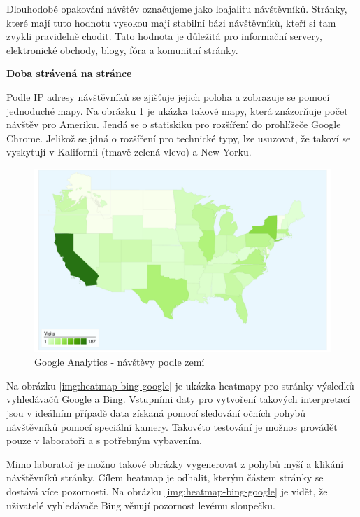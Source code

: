 \documentclass[bc,female,java,dept456]{diploma}						%
\begin{document}
Dlouhodobé opakování návštěv označujeme jako loajalitu návštěvníků. Stránky, které mají tuto hodnotu vysokou mají stabilní bázi návštěvníků, kteří si tam zvykli pravidelně chodit. Tato hodnota je důležitá pro informační servery, elektronické obchody, blogy, fóra a komunitní stránky.

{\bf Doba strávená na stránce}

\bigskip

Podle IP adresy návštěvníků se zjišťuje jejich poloha a zobrazuje se pomocí jednoduché mapy. Na obrázku \ref{img:analytics-map} je ukázka takové mapy, která znázorňuje počet návštěv pro Ameriku. Jendá se o statiskiku pro rozšíření do prohlížeče Google Chrome. Jelikož se jdná o rozšíření pro technické typy, lze usuzovat, že takoví se vyskytují v Kalifornii (tmavě zelená vlevo) a New Yorku.

\begin{figure}[hp]
	\centering
	\includegraphics[width=14.25cm]{img/map-analytics.pdf}
	\caption{Google Analytics - návštěvy podle zemí}
	\label{img:analytics-map}
\end{figure}

\bigskip

Na obrázku \ref{img:heatmap-bing-google} je ukázka heatmapy pro stránky výsledků vyhledávačů Google a Bing. Vstupními daty pro vytvoření takových interpretací jsou v ideálním případě data získaná pomocí sledování očních pohybů návštěvníků pomocí speciální kamery. Takovéto testování je možnos provádět pouze v laboratoři a s potřebným vybavením.

Mimo laboratoř je možno takové obrázky vygenerovat z pohybů myší a klikání návštěvníků stránky. Cílem heatmap je odhalit, kterým částem stránky se dostává více pozornosti. Na obrázku \ref{img:heatmap-bing-google} je vidět, že uživatelé vyhledávače Bing věnují pozornost levému sloupečku. 
\end{document}
